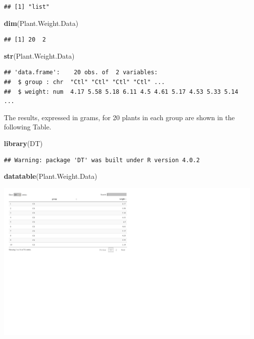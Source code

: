 \documentclass[
]{book}
\newenvironment{Shaded}{\begin{snugshade}}{\end{snugshade}}
\newcommand{\KeywordTok}[1]{\textcolor[rgb]{0.13,0.29,0.53}{\textbf{#1}}}
\newcommand{\NormalTok}[1]{#1}
\begin{document}
\begin{verbatim}
## [1] "list"
\end{verbatim}

\begin{Shaded}
\begin{Highlighting}[]
\KeywordTok{dim}\NormalTok{(Plant.Weight.Data)}
\end{Highlighting}
\end{Shaded}

\begin{verbatim}
## [1] 20  2
\end{verbatim}

\begin{Shaded}
\begin{Highlighting}[]
\KeywordTok{str}\NormalTok{(Plant.Weight.Data)}
\end{Highlighting}
\end{Shaded}

\begin{verbatim}
## 'data.frame':	20 obs. of  2 variables:
##  $ group : chr  "Ctl" "Ctl" "Ctl" "Ctl" ...
##  $ weight: num  4.17 5.58 5.18 6.11 4.5 4.61 5.17 4.53 5.33 5.14 ...
\end{verbatim}

The results, expressed in grams, for 20 plants in each group are shown in the following Table.

\begin{Shaded}
\begin{Highlighting}[]
\KeywordTok{library}\NormalTok{(DT)}
\end{Highlighting}
\end{Shaded}

\begin{verbatim}
## Warning: package 'DT' was built under R version 4.0.2
\end{verbatim}

\begin{Shaded}
\begin{Highlighting}[]
\KeywordTok{datatable}\NormalTok{(Plant.Weight.Data)}
\end{Highlighting}
\end{Shaded}

\includegraphics{SurveyBook_files/figure-latex/rawDataShow-1.pdf}
\end{document}
